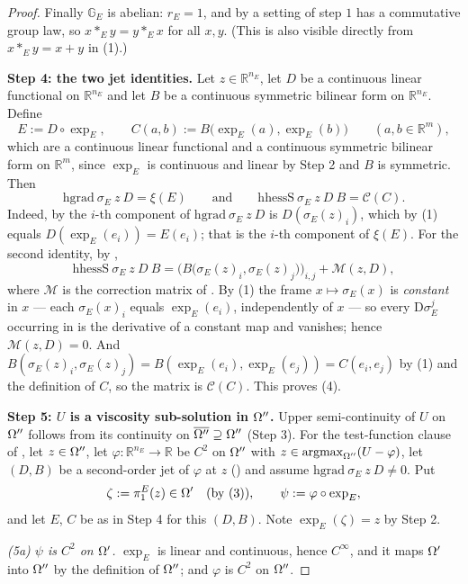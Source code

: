 \begin{proof}
Finally $\mathbb G_E$ is abelian: $r_E=1$, and by  a setting of step
$1$ has a commutative group law, so $x*_Ey=y*_Ex$ for all $x,y$. (This is also visible
directly from $x*_Ey=x+y$ in (1).)

\medskip\noindent\textbf{Step 4: the two jet identities.} Let $z\in\mathbb R^{n_E}$, let $D$
be a continuous linear functional on $\mathbb R^{n_E}$ and let $B$ be a continuous symmetric
bilinear form on $\mathbb R^{n_E}$. Define
\[
 E:=D\circ\exp_E,\qquad C(a,b):=B\big(\exp_E(a),\exp_E(b)\big)\qquad(a,b\in\mathbb R^{m}),
\]
which are a continuous linear functional and a continuous symmetric bilinear form on
$\mathbb R^{m}$, since $\exp_E$ is continuous and linear by Step 2 and $B$ is symmetric. Then
\[
 \mathrm{hgrad}\ \sigma_E\ z\ D=\xi(E)\qquad\text{and}\qquad
 \mathrm{hhessS}\ \sigma_E\ z\ D\ B=\mathcal C(C). \tag{4}
\]
Indeed, by  the $i$-th component of $\mathrm{hgrad}\ \sigma_E\ z\ D$ is
$D(\sigma_E(z)_i)$, which by (1) equals $D(\exp_E(e_i))=E(e_i)$; that is the $i$-th component
of $\xi(E)$. For the second identity, by ,
\[
 \mathrm{hhessS}\ \sigma_E\ z\ D\ B
 =\Big(B\big(\sigma_E(z)_i,\sigma_E(z)_j\big)\Big)_{i,j}+\mathcal M(z,D),
\]
where $\mathcal M$ is the correction matrix of . By (1) the frame
$x\mapsto\sigma_E(x)$ is \emph{constant} in $x$ --- each $\sigma_E(x)_i$ equals
$\exp_E(e_i)$, independently of $x$ --- so every $\mathrm{D}\sigma_E^{j}$ occurring in
 is the derivative of a constant map and vanishes; hence
$\mathcal M(z,D)=0$. And
$B(\sigma_E(z)_i,\sigma_E(z)_j)=B(\exp_E(e_i),\exp_E(e_j))=C(e_i,e_j)$ by (1) and the
definition of $C$, so the matrix is $\mathcal C(C)$. This proves (4).

\medskip\noindent\textbf{Step 5: $U$ is a viscosity sub-solution in $\Omega''$.} Upper
semi-continuity of $U$ on $\Omega''$ follows from its continuity on
$\overline{\Omega''}\supseteq\Omega''$ (Step 3). For the test-function clause of
, let $z\in\Omega''$, let $\varphi:\mathbb R^{n_E}\to\mathbb R$ be $C^{2}$
on $\Omega''$ with $z\in\operatorname*{argmax}_{\Omega''}(U-\varphi)$, let $(D,B)$ be a second-order jet of
$\varphi$ at $z$ () and assume
$\mathrm{hgrad}\ \sigma_E\ z\ D\ne0$. Put
\[
 \zeta:=\pi_1^E(z)\in\Omega'\quad\text{(by (3))},\qquad \psi:=\varphi\circ\exp_E ,
\]
and let $E$, $C$ be as in Step 4 for this $(D,B)$. Note $\exp_E(\zeta)=z$ by Step 2.

\emph{(5a) $\psi$ is $C^{2}$ on $\Omega'$.} $\exp_E$ is linear and continuous, hence
$C^{\infty}$, and it maps $\Omega'$ into $\Omega''$ by the definition of $\Omega''$; and $\varphi$ is
$C^{2}$ on $\Omega''$.


\end{proof}
